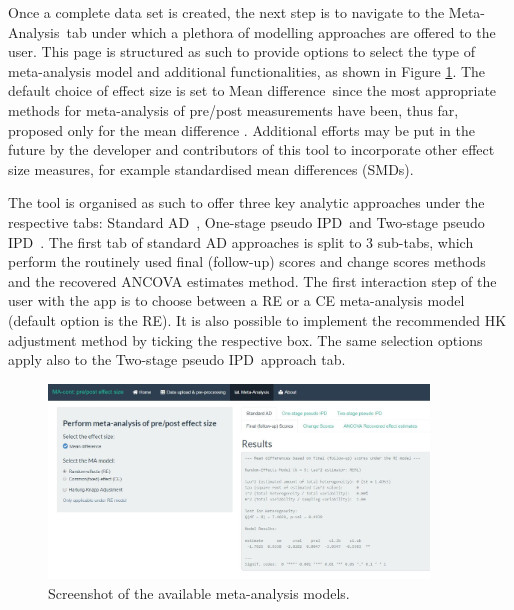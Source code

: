 \documentclass[AMA,STIX1COL]{WileyNJD-v2}
\begin{document}
Once a complete data set is created, the next step is to navigate to the \textquotesingle Meta-Analysis\textquotesingle\ tab under which a plethora of modelling approaches are offered to the user. This page is structured as such to provide options to select the type of meta-analysis model and additional functionalities, as shown in Figure \ref{fig:shiny-choose_analysis}.
The default choice of effect size is set to \textquotesingle Mean difference\textquotesingle\, since the most appropriate methods for meta-analysis of pre/post measurements have been, thus far, proposed only for the mean difference \cite{papadimitropoulou2020meta,papadimitropoulou2022evidence}. Additional efforts may be put in the future by the developer and contributors of this tool to incorporate other effect size measures, for example standardised mean differences (SMDs).

The tool is organised as such to offer three key analytic approaches under the respective tabs: \textquotesingle Standard AD\textquotesingle\ ,  \textquotesingle One-stage pseudo IPD\textquotesingle\ and \textquotesingle Two-stage pseudo IPD\textquotesingle\ . The first tab of standard AD approaches is split to 3 sub-tabs, which perform the routinely used final (follow-up) scores and change scores methods and the recovered ANCOVA estimates method. The first interaction step of the user with the app is to choose between a RE or a CE meta-analysis model (default option is the RE). It is also possible to implement the recommended HK \citep{HartungJ.Knapp2001, sidik2002simple} adjustment method by ticking the respective box. The same selection options apply also to the \textquotesingle Two-stage pseudo IPD\textquotesingle\ approach tab.

\begin{figure}[ht]
  \centering \includegraphics[width=0.9\textwidth]{analysis_options.JPG}
    \caption{\small {Screenshot of the available meta-analysis models.}} \label{fig:shiny-choose_analysis}
\end{figure}
\end{document}
